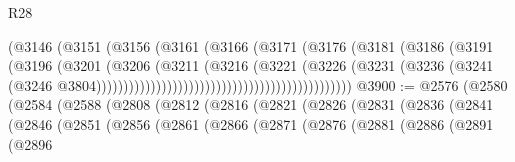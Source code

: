 \begin{lexlean}{R28}
\begin{coremodule}
                                                        (@3146
                                                          (@3151
                                                            (@3156
                                                              (@3161
                                                                (@3166
                                                                  (@3171
                                                                    (@3176
                                                                      (@3181
                                                                        (@3186
                                                                          (@3191
                                                                            (@3196
                                                                              (@3201
                                                                                (@3206
                                                                                  (@3211
                                                                                    (@3216
                                                                                      (@3221
                                                                                        (@3226
                                                                                          (@3231
                                                                                            (@3236
                                                                                              (@3241
                                                                                                (@3246
                                                                                                  @3804)))))))))))))))))))))))))))))))))))))))))))))))
@3900 := @2576
    (@2580
      (@2584
        (@2588
          (@2808
            (@2812
              (@2816
                (@2821
                  (@2826
                    (@2831
                      (@2836
                        (@2841
                          (@2846
                            (@2851
                              (@2856
                                (@2861
                                  (@2866
                                    (@2871
                                      (@2876
                                        (@2881
                                          (@2886
                                            (@2891
                                              (@2896

\end{coremodule}
\end{lexlean}
